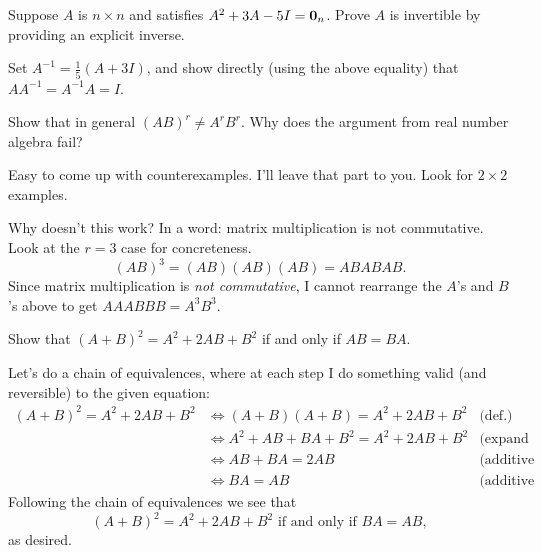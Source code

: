 \ii Suppose $A$ is $n\times n$ and satisfies $A^2+3A-5I={\mathbf 0}_n$. Prove $A$ is invertible by providing an explicit inverse. 
\\
\begin{solution}
Set $A^{-1}=\frac{1}{5}(A+3I)$, and show directly (using the above equality) that $AA^{-1}=A^{-1}A=I$. 
\end{solution}
\ii Show that in general $(AB)^r\ne A^rB^r$. Why does the argument from real number algebra fail?
\\
\begin{solution}
\noindent
Easy to come up with counterexamples. I'll leave that part to you. Look for $2\times 2$ examples. 

Why doesn't this work? In a word: matrix multiplication is not commutative. Look at the $r=3$ case for concreteness. 
\[
(AB)^3=(AB)(AB)(AB)=ABABAB.
\]
Since matrix multiplication is {\em not commutative}, I cannot rearrange the $A$'s and $B$'s above to get $AAABBB=A^3B^3$. 
\end{solution}
\ii Show that $(A+B)^2=A^2+2AB+B^2$ if and only if $AB=BA$. 
\\
\begin{solution}
\noindent
Let's do a chain of equivalences, where at each step I do something valid (and reversible) to the given equation:
\begin{align*}
(A+B)^2=A^2+2AB+B^2&\Leftrightarrow (A+B)(A+B)=A^2+2AB+B^2 &\text{(def.)}\\
&\Leftrightarrow A^2+AB+BA+B^2=A^2+2AB+B^2 &\text{(expand LHS carefully)}\\
&\Leftrightarrow AB+BA=2AB &\text{(additive cancel)}\\
&\Leftrightarrow BA=AB &\text{(additive cancel)}
\end{align*}
Following the chain of equivalences we see that 
\[
(A+B)^2=A^2+2AB+B^2 \text{ if and only if } BA=AB,
\]
as desired. 
\end{solution}

